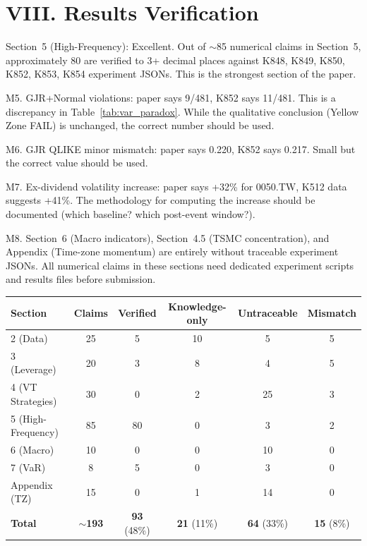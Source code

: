\documentclass[12pt,a4paper]{article}
\begin{document}
\section*{VIII. Results Verification}

\textcolor{okgreen}{Section~5 (High-Frequency): Excellent.} Out of $\sim$85 numerical claims in Section~5, approximately 80 are verified to 3+ decimal places against K848, K849, K850, K852, K853, K854 experiment JSONs. This is the strongest section of the paper.

\textcolor{warncolor}{M5. GJR+Normal violations: paper says 9/481, K852 says 11/481.} This is a discrepancy in Table~\ref{tab:var_paradox}. While the qualitative conclusion (Yellow Zone FAIL) is unchanged, the correct number should be used.

\textcolor{warncolor}{M6. GJR QLIKE minor mismatch: paper says 0.220, K852 says 0.217.} Small but the correct value should be used.

\textcolor{warncolor}{M7. Ex-dividend volatility increase: paper says +32\% for 0050.TW, K512 data suggests +41\%.} The methodology for computing the increase should be documented (which baseline? which post-event window?).

\textcolor{warncolor}{M8. Section~6 (Macro indicators), Section~4.5 (TSMC concentration), and Appendix (Time-zone momentum) are entirely without traceable experiment JSONs.} All numerical claims in these sections need dedicated experiment scripts and results files before submission.

\begin{center}
\begin{tabular}{lccccc}
\toprule
Section & Claims & Verified & Knowledge-only & Untraceable & Mismatch \\
\midrule
2 (Data) & 25 & 5 & 10 & 5 & 5 \\
3 (Leverage) & 20 & 3 & 8 & 4 & 5 \\
4 (VT Strategies) & 30 & 0 & 2 & 25 & 3 \\
5 (High-Frequency) & 85 & 80 & 0 & 3 & 2 \\
6 (Macro) & 10 & 0 & 0 & 10 & 0 \\
7 (VaR) & 8 & 5 & 0 & 3 & 0 \\
Appendix (TZ) & 15 & 0 & 1 & 14 & 0 \\
\midrule
\textbf{Total} & \textbf{$\sim$193} & \textbf{93} (48\%) & \textbf{21} (11\%) & \textbf{64} (33\%) & \textbf{15} (8\%) \\
\bottomrule
\end{tabular}
\end{center}
\end{document}
